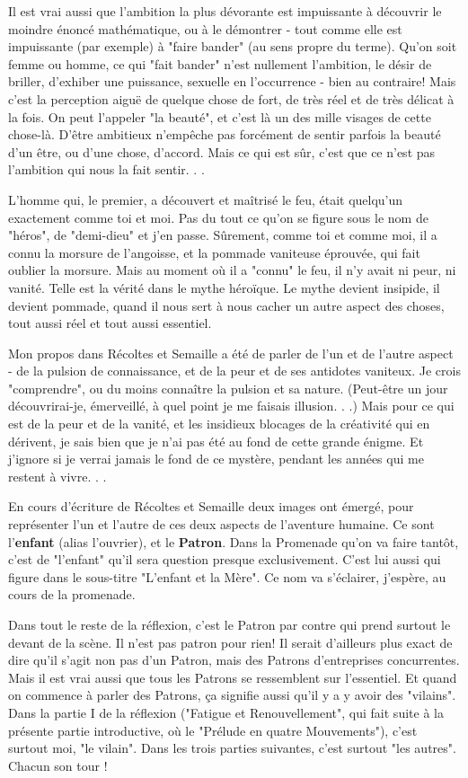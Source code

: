 Il est vrai aussi que l’ambition la plus dévorante est impuissante à découvrir le moindre énoncé mathématique, ou à le démontrer - tout comme elle est impuissante (par exemple) à "faire bander" (au sens propre du terme). Qu’on soit femme ou homme, ce qui "fait bander" n’est nullement l’ambition, le désir de briller, d’exhiber une puissance, sexuelle en l’occurrence - bien au contraire! Mais c’est la perception aiguë de quelque chose de fort, de très réel et de très délicat à la fois. On peut l’appeler "la beauté", et c’est là un des mille visages de cette chose-là. D’être ambitieux n’empêche pas forcément de sentir parfois la beauté d’un être, ou d’une chose, d’accord. Mais ce qui est sûr, c’est que ce n’est pas l’ambition qui nous la fait sentir. . .

L’homme qui, le premier, a découvert et maîtrisé le feu, était quelqu’un exactement comme toi et moi. Pas du tout ce qu’on se figure sous le nom de "héros", de "demi-dieu" et j’en passe. Sûrement, comme toi et comme moi, il a connu la morsure de l’angoisse, et la pommade vaniteuse éprouvée, qui fait oublier la morsure. Mais au moment où il a "connu" le feu, il n’y avait ni peur, ni vanité. Telle est la vérité dans le mythe héroïque. Le mythe devient insipide, il devient pommade, quand il nous sert à nous cacher un autre aspect des choses, tout aussi réel et tout aussi essentiel.

Mon propos dans Récoltes et Semaille a été de parler de l’un et de l’autre aspect - de la pulsion de connaissance, et de la peur et de ses antidotes vaniteux. Je crois "comprendre", ou du moins connaître la pulsion et sa nature. (Peut-être un jour découvrirai-je, émerveillé, à quel point je me faisais illusion. . .) Mais pour ce qui est de la peur et de la vanité, et les insidieux blocages de la créativité qui en dérivent, je sais bien que je n’ai pas été au fond de cette grande énigme. Et j’ignore si je verrai jamais le fond de ce mystère, pendant les années qui me restent à vivre. . .

En cours d’écriture de Récoltes et Semaille deux images ont émergé, pour représenter l’un et l’autre de ces deux aspects de l’aventure humaine. Ce sont l’\textbf{enfant} (alias l’ouvrier), et le \textbf{Patron}. Dans la Promenade qu’on va faire tantôt, c’est de "l’enfant" qu’il sera question presque exclusivement. C’est lui aussi qui figure dans le sous-titre "L’enfant et la Mère". Ce nom va s’éclairer, j’espère, au cours de la promenade.

Dans tout le reste de la réflexion, c’est le Patron par contre qui prend surtout le devant de la scène. Il n’est pas patron pour rien! Il serait d’ailleurs plus exact de dire qu’il s’agit non pas d’un Patron, mais des Patrons d’entreprises concurrentes. Mais il est vrai aussi que tous les Patrons se ressemblent sur l’essentiel. Et quand on commence à parler des Patrons, ça signifie aussi qu’il y a y avoir des "vilains". Dans la partie I de la réflexion ("Fatigue et Renouvellement", qui fait suite à la présente partie introductive, où le "Prélude en quatre Mouvements"), c’est surtout moi, "le vilain". Dans les trois parties suivantes, c’est surtout "les autres". Chacun son tour !

